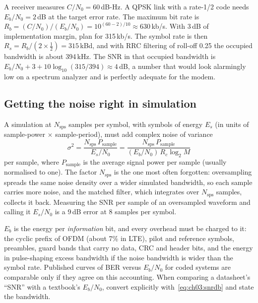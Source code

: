 \begin{worked}
A receiver measures $C/N_0=60$\,dB-Hz. A QPSK link with a rate-1/2 code needs $E_b/N_0=2$\,dB at the target
error rate. The maximum bit rate is $R_b=(C/N_0)/(E_b/N_0)=10^{(60-2)/10}\approx630$\,kb/s. With 3\,dB of
implementation margin, plan for 315\,kb/s. The symbol rate is then $R_s=R_b/(2\times\tfrac12)=315$\,kBd, and
with RRC filtering of roll-off 0.25 the occupied bandwidth is about 394\,kHz. The SNR in that occupied
bandwidth is $E_b/N_0+3+10\log_{10}(315/394)\approx4$\,dB, a number that would look alarmingly low on a
spectrum analyzer and is perfectly adequate for the modem.
\end{worked}

\subsection{Getting the noise right in simulation}

A simulation at $N_{\text{sps}}$ samples per symbol, with symbols of energy $E_s$ (in units of
sample-power $\times$ sample-period), must add complex noise of variance
\begin{equation}
\sigma^2=\frac{N_{\text{sps}}\,P_{\text{sample}}}{E_s/N_0}=\frac{N_{\text{sps}}\,P_{\text{sample}}}{(E_b/N_0)\,R_c\log_2M}
\label{eq:ch03:simnoise}
\end{equation}
per sample, where $P_{\text{sample}}$ is the average signal power per sample (usually normalised to one).
The factor $N_{\text{sps}}$ is the one most often forgotten: oversampling spreads the same noise density
over a wider simulated bandwidth, so each sample carries more noise, and the matched filter, which
integrates over $N_{\text{sps}}$ samples, collects it back. Measuring the SNR per sample of an oversampled
waveform and calling it $E_s/N_0$ is a 9\,dB error at 8 samples per symbol.


\begin{pitfall}
$E_b$ is the energy per \emph{information} bit, and every overhead must be charged to it: the cyclic
prefix of OFDM (about 7\% in LTE), pilot and reference symbols, preambles, guard bands that carry no data,
CRC and header bits, and the energy in pulse-shaping excess bandwidth if the noise bandwidth is wider than
the symbol rate. Published curves of BER versus $E_b/N_0$ for coded systems are comparable only if they
agree on this accounting. When comparing a datasheet's ``SNR'' with a textbook's $E_b/N_0$, convert
explicitly with~\eqref{eq:ch03:snrdb} and state the bandwidth.
\end{pitfall}

